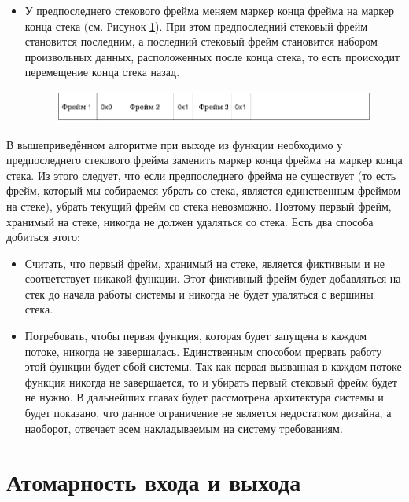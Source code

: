 \documentclass[times,specification,annotation]{itmo-student-thesis}
\begin{document}
\begin{itemize}
    \item У предпоследнего стекового фрейма меняем маркер конца фрейма на маркер конца стека (см. Рисунок \ref{after-moving-backward-pic}). При этом предпоследний стековый фрейм становится последним, а последний стековый фрейм становится набором произвольных данных, расположенных после конца стека, то есть происходит перемещение конца стека назад.
    
    \begin{figure}[H]
      \centering
      \includegraphics[width=\linewidth]{4.png}
      \label{after-moving-backward-pic}
    \end{figure}
\end{itemize}

В вышеприведённом алгоритме при выходе из функции необходимо у предпоследнего стекового фрейма заменить маркер конца фрейма на маркер конца стека. Из этого следует, что если предпоследнего фрейма не существует (то есть фрейм, который мы собираемся убрать со стека, является единственным фреймом на стеке), убрать текущий фрейм со стека невозможно. Поэтому первый фрейм, хранимый на стеке, никогда не должен удаляться со стека. Есть два способа добиться этого:

\begin{itemize}
    \item Считать, что первый фрейм, хранимый на стеке, является фиктивным и не соответствует никакой функции. Этот фиктивный фрейм будет добавляться на стек до начала работы системы и никогда не будет удаляться с вершины стека.
    
    \item Потребовать, чтобы первая функция, которая будет запущена в каждом потоке, никогда не завершалась. Единственным способом прервать работу этой функции будет сбой системы. Так как первая вызванная в каждом потоке функция никогда не завершается, то и убирать первый стековый фрейм будет не нужно. В дальнейших главах будет рассмотрена архитектура системы и будет показано, что данное ограничение не является недостатком дизайна, а наоборот, отвечает всем накладываемым на систему требованиям.
\end{itemize}


\section{Атомарность входа и выхода}
\end{document}
